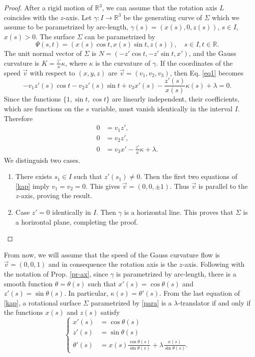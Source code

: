 \documentclass[12pt]{amsart}
\def\r{\mathbb R}
\theoremstyle{definition}
\begin{document}
\begin{proof}
 After a rigid motion of $\r^3$, we   can assume that the rotation axis $L$ coincides with the $z$-axis. Let $\gamma\colon I\to\r^3$ be the generating curve of $\Sigma$ which we assume to be parametrized by arc-length,  $\gamma(s)=(x(s),0,z(s))$, $s\in I$, $x(s)>0$. The surface $\Sigma$ can be parametrized by  
\begin{equation}\label{para}
\Psi(s,t)=(x(s)\cos t,x(s)\sin t,z(s)), \quad s\in I, t\in \r.
\end{equation}
 The unit normal vector of $\Sigma$ is $N=(-z'\cos t,-z'\sin t,x')$, and the Gauss curvature   is $K=\frac{z'}{x}\kappa$, where $\kappa$ is the curvature of $\gamma$. If the coordinates of  the speed $\vec{v}$ with respect to $(x,y,z)$ are $\vec{v}=(v_1,v_2,v_3)$, then Eq. \eqref{eq1}   becomes
\begin{equation*}
-v_1z'(s)\cos t-v_2z'(s)\sin t+v_3x'(s)-\frac{z'(s)}{x(s)}\kappa(s)+\lambda=0.
\end{equation*}
Since the functions $\{1,\sin t,\cos t\}$ are linearly independent, their coefficients, which are functions on the $s$ variable, must vanish identically in the interval $I$. Therefore  
\begin{equation}
\begin{split}
0&=v_1z', \\
0&=v_2z', \\
0&=v_3x'-\frac{z'}{x}\kappa+\lambda.
\end{split}  \label{kap}
\end{equation}
We distinguish two cases.
\begin{enumerate}
\item There exists $s_1\in I$ such that $z'(s_1)\not=0$. Then the first two equations of \eqref{kap} imply $v_1=v_2=0$. This gives $\vec{v}=(0,0,\pm 1)$. Thus $\vec{v}$ is parallel to the $z$-axis,  proving the result.
\item Case $z'=0$ identically in $I$. Then $\gamma$ is a horizontal line. This proves that $\Sigma$ is a horizontal plane, completing the proof.  
\end{enumerate}
\end{proof}


 From now, we will assume that the speed of the Gauss curvature flow is $\vec{v}=(0,0,1)$ and in consequence the rotation axis is the $z$-axis.  Following with the notation of Prop. \ref{pr-ax}, since    $\gamma$ is parametrized by arc-length, there is a smooth function $\theta=\theta(s)$ such that   $x'(s)=\cos\theta(s)$ and  $z'(s)=\sin\theta(s)$. In particular, $\kappa(s)=\theta'(s)$. From   the last equation of \eqref{kap}, a rotational surface $\Sigma$ parametrized by \eqref{para}  is a $\lambda$-translator   if and only if the functions $x(s)$ and $z(s)$ satisfy
\begin{equation}\label{trig}
\left\{
\begin{split}
x'(s)&=\cos\theta(s) \\ 
z'(s)&=\sin\theta(s) \\
\theta'(s) &=x(s)\frac{\cos\theta(s)}{\sin\theta(s)}+\lambda \frac{x(s)}{\sin\theta (s)}.
\end{split}\right.
\end{equation}
 
\end{document}
